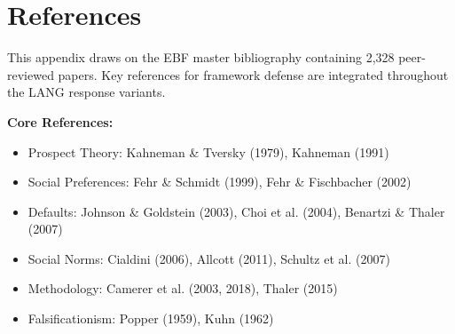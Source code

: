 \section{References}
\label{sec:da2-references}

This appendix draws on the EBF master bibliography containing 2,328 peer-reviewed papers.
Key references for framework defense are integrated throughout the LANG response variants.

\nocite{bcm_master}

\textbf{Core References:}
\begin{itemize}[nosep]
    \item Prospect Theory: Kahneman \& Tversky (1979), Kahneman (1991)
    \item Social Preferences: Fehr \& Schmidt (1999), Fehr \& Fischbacher (2002)
    \item Defaults: Johnson \& Goldstein (2003), Choi et al. (2004), Benartzi \& Thaler (2007)
    \item Social Norms: Cialdini (2006), Allcott (2011), Schultz et al. (2007)
    \item Methodology: Camerer et al. (2003, 2018), Thaler (2015)
    \item Falsificationism: Popper (1959), Kuhn (1962)
\end{itemize}


